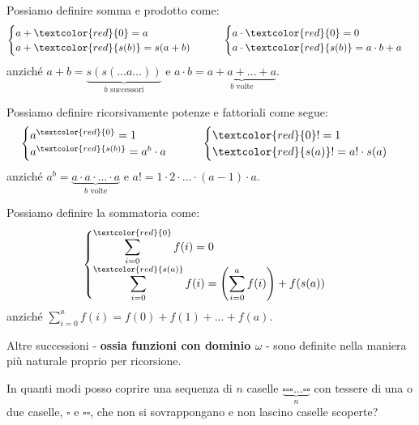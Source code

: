 \documentclass[11pt]{scrartcl}
\begin{document}
\begin{example}
	Possiamo definire somma e prodotto come:
	\[ \begin{cases}
		a + \textcolor{red}{0} = a \\
		a + \textcolor{red}{s(b)} = s(a + b)
	\end{cases}
	\qquad
	\begin{cases}
		a \cdot \textcolor{red}{0} = 0\\
		a \cdot \textcolor{red}{s(b)} = a \cdot b + a
	\end{cases}
		\]
	anziché $a + b = \underbrace{s(s(\ldots a \ldots))}_{\text{$b$ successori}}$ e $a \cdot b = \underbrace{a + a + \ldots + a}_{\text{$b$ volte}}$.
\end{example}

\begin{example}
	Possiamo definire ricorsivamente potenze e fattoriali come segue:
	\[ \begin{cases}
		a^{\textcolor{red}{0}} = 1\\
		a^{\textcolor{red}{s(b)}} = a^b \cdot a
	\end{cases}
	\qquad
	\begin{cases}
		\textcolor{red}{0}! = 1\\
		\textcolor{red}{s(a)}! = a! \cdot s(a)
	\end{cases}
		\]
	anziché $a^b = \underbrace{a \cdot a \cdot \ldots \cdot a}_{\text{$b$ volte}}$ e $a! = 1 \cdot 2 \cdot \ldots \cdot (a - 1) \cdot a$.
\end{example}

\begin{example}
	[Sommatoria]
	Possiamo definire la sommatoria come:
	\[\begin{cases}
		\displaystyle
		\sum_{i = 0}^{\textcolor{red}{0}} f(i) = 0\\
		\displaystyle
		\sum_{i = 0}^{\textcolor{red}{s(a)}} f(i) = \left(\sum_{i=0}^{a} f(i) \right) + f(s(a))
	\end{cases}
		\]
	anziché $\displaystyle\sum_{i = 0}^a f(i) = f(0) + f(1) + \ldots + f(a)$.
\end{example}

Altre successioni - \textbf{ossia funzioni con dominio $\omega$} - sono definite nella maniera più naturale proprio per ricorsione.

\begin{example}
	In quanti modi posso coprire una sequenza di $n$ caselle $\underbrace{\square\square\square\ldots\square\square}_{n}$ con tessere di una o due caselle,
	$\square$ e $\square\square$, che non si sovrappongano e non lascino caselle scoperte?
\end{example}
\end{document}
